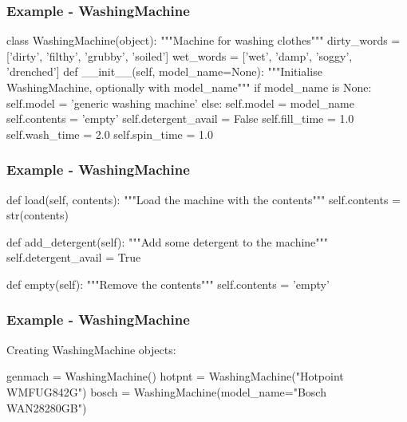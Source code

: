 \documentclass{beamer}
\begin{document}
\begin{frame}[fragile]
\frametitle{Example - WashingMachine}
\begin{code}
class WashingMachine(object):
    """Machine for washing clothes"""
    dirty_words = ['dirty', 'filthy', 'grubby', 'soiled']
    wet_words = ['wet', 'damp', 'soggy', 'drenched']
    def __init__(self, model_name=None):
        """Initialise WashingMachine, optionally with model_name"""
        if model_name is None:
            self.model = 'generic washing machine'
        else:
            self.model = model_name
        self.contents = 'empty'
        self.detergent_avail = False
        self.fill_time = 1.0
        self.wash_time = 2.0
        self.spin_time = 1.0
\end{code}
\end{frame}

\begin{frame}[fragile]
\frametitle{Example - WashingMachine}
\begin{code}
    def load(self, contents):
        """Load the machine with the contents"""
        self.contents = str(contents)
        
    def add_detergent(self):
        """Add some detergent to the machine"""
        self.detergent_avail = True
        
    def empty(self):
        """Remove the contents"""
        self.contents = 'empty'
\end{code}
\end{frame}

\begin{frame}[fragile]
\frametitle{Example - WashingMachine}
Creating WashingMachine objects:
\begin{code}
genmach = WashingMachine()
hotpnt = WashingMachine("Hotpoint WMFUG842G")
bosch = WashingMachine(model_name="Bosch WAN28280GB")
\end{code}
\end{frame}
\end{document}
